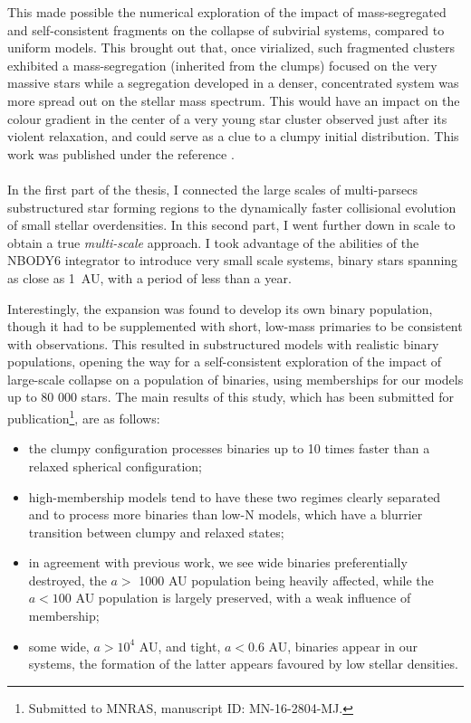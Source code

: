 This made possible the numerical exploration of the impact of mass-segregated and self-consistent fragments on the collapse of subvirial systems, compared to uniform models.  This brought out that, once virialized, such fragmented clusters exhibited a mass-segregation (inherited from the clumps) focused on the very massive stars while a segregation developed in a denser, concentrated system was more spread out on the stellar mass spectrum. This would have an impact on the colour gradient in the center of a very young star cluster  observed just after its violent relaxation, and could serve as a clue to a clumpy initial distribution. This work was published under the reference \cite{Dorval2016}.



\paragraph*{}
In the first part of the thesis, I connected the large scales of multi-parsecs substructured star forming regions to the dynamically faster collisional evolution of small stellar overdensities. In this second part, I went further down in scale to obtain a true \textit{multi-scale} approach. I took advantage of the abilities of the NBODY6 integrator to introduce very small scale systems, binary stars spanning as close as 1~AU, with a period of less than a year.

Interestingly, the \HubLem expansion was found to develop its own binary population, though it had to be supplemented with short, low-mass primaries to be consistent with observations. This resulted in substructured models with realistic binary populations, opening the way for a self-consistent exploration of the impact of large-scale collapse on a population of binaries, using memberships for our models up to 80 000 stars. The main results of this study, which has been submitted for publication\footnote{Submitted to MNRAS, manuscript ID: MN-16-2804-MJ.}, are as follows:

\begin{itemize}
\item the clumpy configuration processes binaries up to 10 times faster than a relaxed spherical configuration;
\item high-membership models tend to have these two regimes clearly separated and to process more binaries than low-N models, which have a blurrier transition between clumpy and relaxed states;
\item in agreement with previous work, we see wide binaries preferentially destroyed, the $a >$ 1000 AU population being heavily affected, while the $a < 100$ AU population is largely preserved, with a weak influence of membership;
\item some wide, $a > 10^4$ AU, and tight, $a < 0.6$ AU, binaries appear in our systems, the formation of the latter appears favoured by low stellar densities.
\end{itemize}

